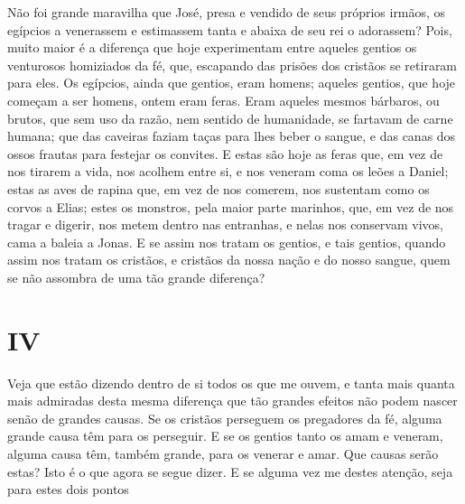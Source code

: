 Não foi grande maravilha que José, presa e vendido de seus próprios
irmãos, os egípcios a venerassem e estimassem tanta e abaixa de seu rei
o adorassem? Pois, muito maior é a diferença que hoje experimentam entre
aqueles gentios os venturosos homiziados da fé, que, escapando das
prisões dos cristãos se retiraram para eles. Os egípcios, ainda que
gentios, eram homens; aqueles gentios, que hoje começam a ser homens,
ontem eram feras. Eram aqueles mesmos bárbaros, ou brutos, que sem uso
da razão, nem sentido de humanidade, se fartavam de carne humana; que
das caveiras faziam taças para lhes beber o sangue, e das canas dos
ossos frautas para festejar os convites. E estas são hoje as feras que,
em vez de nos tirarem a vida, nos acolhem entre si, e nos veneram coma
os leões a Daniel; estas as aves de rapina que, em vez de nos comerem,
nos sustentam como os corvos a Elias; estes os monstros, pela maior
parte marinhos, que, em vez de nos tragar e digerir, nos metem dentro
nas entranhas, e nelas nos conservam vivos, cama a baleia a Jonas. E se
assim nos tratam os gentios, e tais gentios, quando assim nos tratam os
cristãos, e cristãos da nossa nação e do nosso sangue, quem se não
assombra de uma tão grande diferença?

\section*{IV}

Veja que estão dizendo dentro de si todos os que me ouvem, e tanta mais
quanta mais admiradas desta mesma diferença que tão grandes efeitos não
podem nascer senão de grandes causas. Se os cristãos perseguem os
pregadores da fé, alguma grande causa têm para os perseguir. E se os
gentios tanto os amam e veneram, alguma causa têm, também grande, para
os venerar e amar. Que causas serão estas? Isto é o que agora se segue
dizer. E se alguma vez me destes atenção, seja para estes dois pontos

